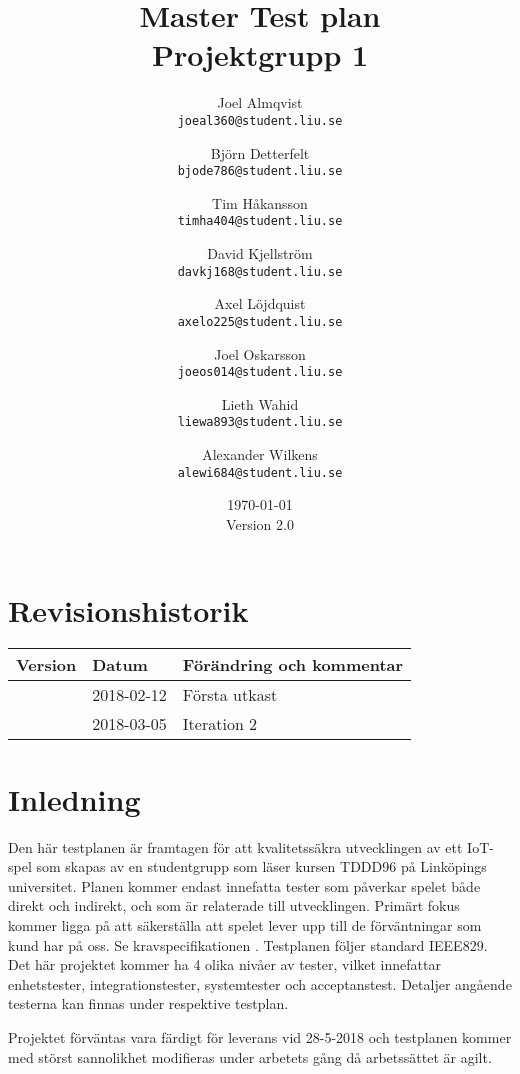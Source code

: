 \documentclass[10pt]{article}
\title{Master Test plan\\
    \large Projektgrupp 1}
\author{
    Joel Almqvist\\
    \texttt{joeal360@student.liu.se}
    \and
    Björn Detterfelt\\
    \texttt{bjode786@student.liu.se}
    \and
    Tim Håkansson\\
    \texttt{timha404@student.liu.se}
    \and
    David Kjellström\\
    \texttt{davkj168@student.liu.se}
    \and
    Axel Löjdquist\\
    \texttt{axelo225@student.liu.se}
    \and
    Joel Oskarsson\\
    \texttt{joeos014@student.liu.se}
    \and
    Lieth Wahid\\
    \texttt{liewa893@student.liu.se}
    \and
    Alexander Wilkens\\
    \texttt{alewi684@student.liu.se}
}
\begin{document}
\date{\today \\Version 2.0}



\maketitle
\pagebreak
	\section*{Revisionshistorik}

	
	\begin{center}
 	   \begin{tabular}{| l | l | p{12cm} |  }
 	       \hline
 	       \textbf{Version} & \textbf{Datum} & \textbf{Förändring och kommentar} \\
 	       \hline
 	       \centering 1.0 & 2018-02-12 & Första utkast\\
		\hline
 	       \centering 2.0 & 2018-03-05 & Iteration 2\\
 	       \hline
 	   \end{tabular}
	\end{center}

	
	
\pagebreak
\tableofcontents
\pagebreak
{}

\section{Inledning}
	Den här testplanen är framtagen för att kvalitetssäkra utvecklingen av ett IoT-spel som skapas av en studentgrupp som läser kursen TDDD96 på Linköpings universitet. Planen kommer endast innefatta tester som påverkar spelet både direkt och indirekt, och som är relaterade till utvecklingen. Primärt fokus kommer ligga på att säkerställa att spelet lever upp till de förväntningar som kund har på oss. Se kravspecifikationen \cite{bib-kravspec}. Testplanen följer standard IEEE829. \\

Det här projektet kommer ha 4 olika nivåer av tester, vilket innefattar enhetstester, integrationstester, systemtester och acceptanstest. Detaljer angående testerna kan finnas under respektive testplan.

Projektet förväntas vara färdigt för leverans vid 28-5-2018 och testplanen kommer med störst sannolikhet modifieras under arbetets gång då arbetssättet är agilt.
\end{document}
